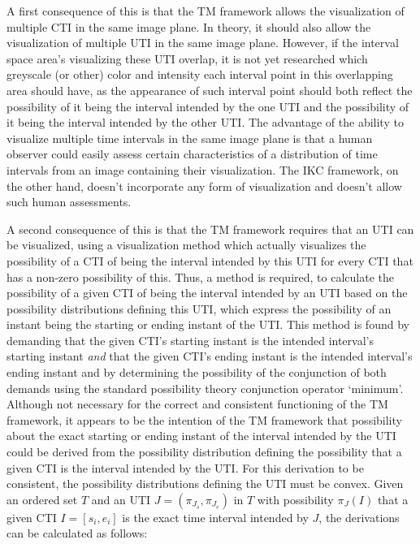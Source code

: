 A first consequence of this is that the TM framework allows the visualization of multiple CTI in the same image plane. In theory, it should also allow the visualization of multiple UTI in the same image plane. However, if the interval space area's visualizing these UTI overlap, it is not yet researched which greyscale (or other) color and intensity each interval point in this overlapping area should have, as the appearance of such interval point should both reflect the possibility of it being the interval intended by the one UTI and the possibility of it being the interval intended by the other UTI. The advantage of the ability to visualize multiple time intervals in the same image plane is that a human observer could easily assess certain characteristics of a distribution of time intervals from an image containing their visualization. The IKC framework, on the other hand, doesn't incorporate any form of visualization and doesn't allow such human assessments.

A second consequence of this is that the TM framework requires that an UTI can be visualized, using a visualization method which actually visualizes the possibility of a CTI of being the interval intended by this UTI for every CTI that has a non-zero possibility of this. Thus, a method is required, to calculate the possibility of a given CTI of being the interval intended by an UTI based on the possibility distributions defining this UTI, which express the possibility of an instant being the starting or ending instant of the UTI. This method is found by demanding that the given CTI's starting instant is the intended interval's starting instant \emph{and} that the given CTI's ending instant is the intended interval's ending instant and by determining the possibility of the conjunction of both demands using the standard possibility theory conjunction operator `minimum'. Although not necessary for the correct and consistent functioning of the TM framework, it appears to be the intention of the TM framework that possibility about the exact starting or ending instant of the interval intended by the UTI could be derived from the possibility distribution defining the possibility that a given CTI is the interval intended by the UTI. For this derivation to be consistent, the possibility distributions defining the UTI must be convex. Given an ordered set $T$ and an UTI $J = (\pi_{J_s}, \pi_{J_e})$ in $T$ with possibility $\pi_J(I)$ that a given CTI $I = \left[s_i, e_i\right]$ is the exact time interval intended by $J$, the derivations can be calculated as follows:

